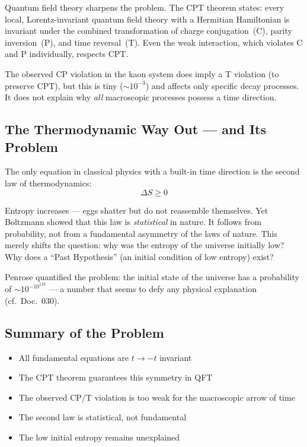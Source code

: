 Quantum field theory sharpens the problem. The CPT theorem states: every local, Lorentz-invariant quantum field theory with a Hermitian Hamiltonian is invariant under the combined transformation of charge conjugation~(C), parity inversion~(P), and time reversal~(T). Even the weak interaction, which violates C and P individually, respects CPT.

The observed CP violation in the kaon system does imply a T violation (to preserve CPT), but this is tiny ($\sim 10^{-3}$) and affects only specific decay processes. It does not explain why \emph{all} macroscopic processes possess a time direction.

\subsection{The Thermodynamic Way Out --- and Its Problem}

The only equation in classical physics with a built-in time direction is the second law of thermodynamics:
\begin{equation}
	\Delta S \geq 0
\end{equation}

Entropy increases --- eggs shatter but do not reassemble themselves. Yet Boltzmann showed that this law is \emph{statistical} in nature. It follows from probability, not from a fundamental asymmetry of the laws of nature. This merely shifts the question: why was the entropy of the universe initially low? Why does a ``Past Hypothesis'' (an initial condition of low entropy) exist?

Penrose quantified the problem: the initial state of the universe has a probability of $\sim 10^{-10^{123}}$ --- a number that seems to defy any physical explanation (cf.\ Doc.~030).

\subsection{Summary of the Problem}

\begin{itemize}
	\item All fundamental equations are $t \to -t$ invariant
	\item The CPT theorem guarantees this symmetry in QFT
	\item The observed CP/T violation is too weak for the macroscopic arrow of time
	\item The second law is statistical, not fundamental
	\item The low initial entropy remains unexplained
\end{itemize}

